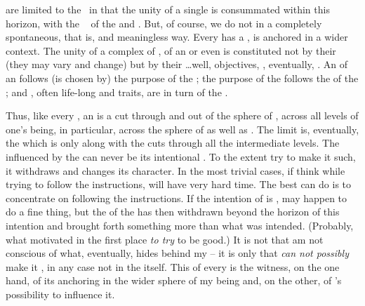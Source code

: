 \pa\label{acts}  are limited to the \hoa\ in that the unity of a single
 is consummated within this horizon, with the \equi\  of the
 and .  But, of course, we do not 
in a completely spontaneous, that is,  and meaningless way.
Every  has a , is anchored in a wider context.  The unity of a
complex of , of an  or even  is constituted not
by their  (they may vary and change) but by their \ldots well,
objectives, , eventually, .  An  of
an  follows (is chosen by) the purpose of the ; the purpose
of the  follows the  of the ; and
, often life-long  and traits, are in turn
 of the .

Thus, like every , an  is a cut through and out of
the sphere of , across all levels of one's being, in particular,
across the sphere of  as well as .  The
 limit is, eventually, the  which is  only
along with the cuts through all the intermediate levels.  The 
influenced by the  can never be its intentional .  To the
extent  try to make it such, it withdraws and changes its character.  In
the most trivial cases, if  think  while trying to follow the instructions,  will
have very hard time.  The best  can do is to concentrate on following the
instructions.  If the intention of  is ,  may
happen to do a fine thing, but the  of the  has
then withdrawn beyond the horizon of this intention and brought forth something
more than what was intended.  (Probably, what motivated  in the first
place {\em to try} to be good.)  It is not that  am not conscious of what,
eventually, hides behind my  -- it is only that  {\em can not
  possibly} make it , in any case not in the 
itself.  This  of every  is the witness, on the one hand, of
its anchoring in the wider sphere of my being and, on the other, of 's
possibility to influence it.

